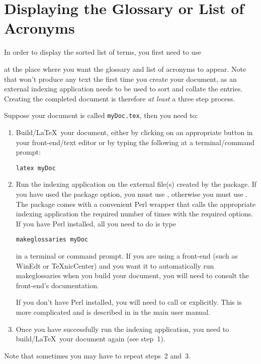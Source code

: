 \documentclass{nlctdoc}
\begin{document}
\section{Displaying the Glossary or List of Acronyms}
\label{printglossaries}

In order to display the sorted list of terms, you first need to
use
\begin{definition}
\end{definition}
at the place where you want the glossary and list of acronyms to
appear.  Note that  won't produce any text the
first time you create your document, as an external indexing
application needs to be used to sort and collate the entries.
Creating the completed document is therefore \emph{at least} a three
step process.

Suppose your document is called \texttt{myDoc.tex}, then you need
to:
\begin{enumerate}
\item Build/\LaTeX\ your document, either by clicking on an
appropriate button in your front-end/text editor or by typing the
following at a terminal/command prompt:
\begin{verbatim}
latex myDoc
\end{verbatim}

\item Run the indexing application on the external file(s) created
by the  package. If you have used the 
package option, you must use , otherwise you must use 
. The  package comes with a convenient
Perl wrapper that calls the appropriate indexing application the
required number of times with the required options. If you have Perl
installed, all you need to do is type
\begin{verbatim}
makeglossaries myDoc
\end{verbatim}
in a terminal or command prompt. If you are using a front-end (such
as WinEdt or TeXnicCenter) and you want it to automatically run
makeglossaries when you build your document, you will need to
consult the front-end's documentation.

If you don't have Perl installed, you will need to call 
or  explicitly. This is more complicated and is described in 
in the main  user manual.

\item Once you have successfully run the indexing application, you
need to build/\LaTeX\ your document again (see step~1).
\end{enumerate}
Note that sometimes you may have to repeat steps~2 and~3.
\end{document}
